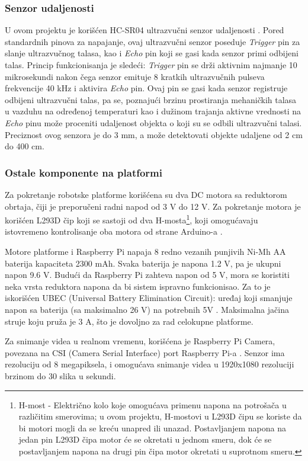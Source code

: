 \documentclass[12pt,a4paper]{report}
\begin{document}
\subsubsection{Senzor udaljenosti}
U ovom projektu je korišćen HC-SR04 ultrazvučni senzor udaljenosti  \cite{distance}. Pored standardnih pinova za napajanje, ovaj ultrazvučni senzor poseduje \emph{Trigger} pin za slanje ultrazvučnog talasa, kao i \emph{Echo} pin koji se gasi kada senzor primi odbijeni talas. Princip funkcionisanja je sledeći: \emph{Trigger} pin se drži aktivnim najmanje 10 mikrosekundi nakon čega senzor emituje 8 kratkih ultrazvučnih pulseva frekvencije 40 kHz i aktivira \emph{Echo} pin. Ovaj pin se gasi kada senzor registruje odbijeni ultrazvučni talas, pa se, poznajući brzinu prostiranja mehaničkih talasa u vazduhu na određenoj temperaturi kao i dužinom trajanja aktivne vrednosti na \emph{Echo} pinu može proceniti udaljenost objekta o koji su se odbili ultrazvučni talasi. Preciznost ovog senzora je do 3 mm, a može detektovati objekte udaljene od 2 cm do 400 cm.
\subsubsection{Ostale komponente na platformi}
Za pokretanje robotske platforme korišćena su dva DC motora sa reduktorom obrtaja, čiji je preporučeni radni napod od 3 V do 12 V. Za pokretanje motora je korišćen L293D čip koji se sastoji od dva H-mosta\footnote{H-most - Električno kolo koje omogućava primenu napona na potrošača u različitim smerovima; u ovom projektu, H-mostovi u L293D čipu se koriste da bi motori mogli da se kreću unapred ili unazad. Postavljanjem napona na jedan pin L293D čipa motor će se okretati u jednom smeru, dok će se postavljanjem napona na drugi pin čipa motor okretati u suprotnom smeru.}, koji omogućavaju istovremeno kontrolisanje oba motora od strane Arduino-a \cite{l293d}.

Motore platforme i Raspberry Pi napaja 8 redno vezanih punjivih Ni-Mh AA baterija kapaciteta 2300 mAh. Svaka baterija je napona 1.2 V, pa je ukupni napon 9.6 V. Budući da Raspberry Pi zahteva napon od 5 V, mora se koristiti neka vrsta reduktora napona da bi sistem ispravno funkcionisao. Za to je iskorišćen UBEC (Universal Battery Elimination Circuit): uređaj koji smanjuje napon sa baterija (sa maksimalno 26 V) na potrebnih 5V \cite{ubec}. Maksimalna jačina struje koju pruža je 3 A, što je dovoljno za rad celokupne platforme.

Za snimanje videa u realnom vremenu, korišćena je Raspberry Pi Camera, povezana na CSI (Camera Serial Interface) port Raspberry Pi-a \cite{picamera}. Senzor ima rezoluciju od 8 megapiksela, i omogućava snimanje videa u 1920x1080 rezoluciji brzinom do 30 slika u sekundi.
\end{document}
